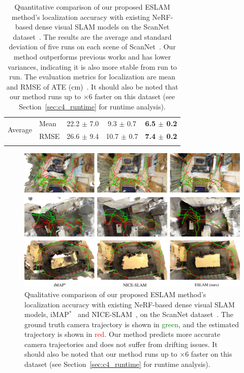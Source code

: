 \begin{table}[t]
\begin{center}
\begin{tabular}{ll|ccc}
            \hline
            \multirow{2}{*}{Average} & Mean & 22.2 $\pm$ \phantom{0}7.0 & \phantom{0}9.3 $\pm$ 0.7 & \textbf{6.5 $\pm$ 0.2} \\
            & RMSE & 26.6 $\pm$ \phantom{0}9.4 & 10.7 $\pm$ 0.7 & \textbf{7.4 $\pm$ 0.2} \\

            \Xhline{2\arrayrulewidth}
        \end{tabular}
    \end{center}
    \caption{Quantitative comparison of our proposed ESLAM method's localization accuracy with existing NeRF-based dense visual SLAM models on the ScanNet dataset~\citep{dai2017scannet}. The results are the average and standard deviation of five runs on each scene of ScanNet~\citep{dai2017scannet}. Our method outperforms previous works and has lower variances, indicating it is also more stable from run to run. The evaluation metrics for localization are mean and RMSE of ATE (cm)~\citep{sturm2012benchmark}. It should also be noted that our method runs up to $\times$6 faster on this dataset (see Section~\ref{sec:c4_runtime} for runtime analysis).}
    \label{table:quantitative_scannet}
\end{table}

\begin{figure}[t]
    \begin{center}
        \includegraphics[width=1.0\linewidth]{images/chapter4/figures/Fig4.jpg}
    \end{center}
    \caption{Qualitative comparison of our proposed ESLAM method's localization accuracy with existing NeRF-based dense visual SLAM models, iMAP$^*$~\citep{sucar2021imap} and NICE-SLAM~\citep{zhu2022nice}, on the ScanNet dataset~\citep{dai2017scannet}. The ground truth camera trajectory is shown in \textcolor{green}{green}, and the estimated trajectory is shown in \textcolor{red}{red}. Our method predicts more accurate camera trajectories and does not suffer from drifting issues. It should also be noted that our method runs up to $\times$6 faster on this dataset (see Section~\ref{sec:c4_runtime} for runtime analysis).}
    \label{fig:c4_qualitative_tracking}
\end{figure}

